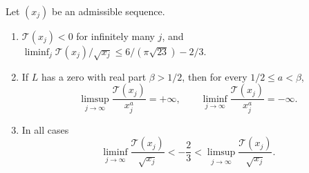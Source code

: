 \begin{theorem}\label{hec:thm:osc}
Let $(x_j)$ be an admissible sequence.
\begin{enumerate}[label=\textup{(\roman*)}]
\item $\mathcal{T}(x_j)<0$ for infinitely many $j$, and
$\liminf_{j}\mathcal{T}(x_j)/\sqrt{x_j}\le6/(\pi\sqrt{23})-2/3$.
\item If $L$ has a zero with real part $\beta>1/2$, then for every $1/2\le a<\beta$,
\[
 \limsup_{j\to\infty}\frac{\mathcal{T}(x_j)}{x_j^{a}}=+\infty,\qquad
 \liminf_{j\to\infty}\frac{\mathcal{T}(x_j)}{x_j^{a}}=-\infty .
\]
\item In all cases
\[
 \liminf_{j\to\infty}\frac{\mathcal{T}(x_j)}{\sqrt{x_j}}<-\frac23<\limsup_{j\to\infty}\frac{\mathcal{T}(x_j)}{\sqrt{x_j}}.
\]
\end{enumerate}
\end{theorem}

